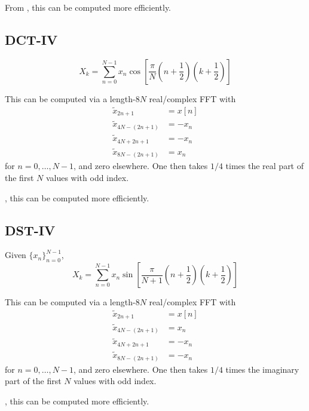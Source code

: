 \documentclass[12pt]{article}
\renewcommand{\(}{\left(}
\renewcommand{\)}{\right)}
\begin{document}
From \cite{shaojohnsondst23}, this can be computed more efficiently.

\subsection{DCT-IV}

\begin{dmath}
  X_k = \sum_{n=0}^{N-1} x_n \cos\left[\frac{\pi}{N}\(n + \frac{1}{2}\) \(k + \frac{1}{2}\) \right]
\end{dmath}

This can be computed via a length-$8N$ real/complex FFT with 
\begin{align}
  \tilde{x}_{2 n + 1} &= x[n] \\
  \tilde{x}_{4 N - (2 n + 1)} &= -x_n \\
  \tilde{x}_{4 N + 2 n + 1} &= -x_n \\
  \tilde{x}_{8 N - (2 n + 1)} &= x_n
\end{align}
for $n=0, \dots, N-1$, and zero elsewhere.  One then takes $1/4$ times
the real part of the first $N$ values with odd index.

\cite{shaojohnsondst4}, this can be computed more efficiently.

\subsection{DST-IV}

Given $\{x_n\}_{n=0}^{N-1}$,
\begin{dmath}
  X_k = \sum_{n=0}^{N-1}x_n \sin\left[\frac{\pi}{N+1}\(n+\frac{1}{2}\)\(k+\frac{1}{2}\)\right]
\end{dmath}

This can be computed via a length-$8N$ real/complex FFT with 
\begin{align}
  \tilde{x}_{2 n + 1} &= x[n] \\
  \tilde{x}_{4 N - (2 n + 1)} &= x_n \\
  \tilde{x}_{4 N + 2 n + 1} &= -x_n \\
  \tilde{x}_{8 N - (2 n + 1)} &= -x_n
\end{align}
for $n=0, \dots, N-1$, and zero elsewhere.  One then takes $1/4$ times
the imaginary part of the first $N$ values with odd index.


\cite{shaojohnsondst4}, this can be computed more efficiently.



\end{document}

